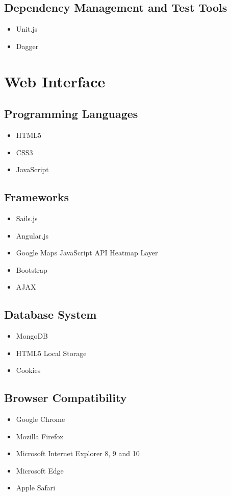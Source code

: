 \documentclass[11pt,fleqn]{book} %
\begin{document}
	\subsection{Dependency Management and Test Tools}
	\begin{itemize}
		\item Unit.js
		\item Dagger
	\end{itemize}
	\section{Web Interface}
	\subsection{Programming Languages}
	\begin{itemize}
		\item HTML5
		\item CSS3
		\item JavaScript
	\end{itemize}
	\subsection{Frameworks}
	\begin{itemize}
		\item Sails.js
		\item Angular.js
		\item Google Maps JavaScript API Heatmap Layer
		\item Bootstrap
		\item AJAX					
	\end{itemize}
	\subsection{Database System}
	\begin{itemize}
		\item MongoDB
		\item HTML5 Local Storage
		\item Cookies				
	\end{itemize}
	\subsection{Browser Compatibility}
	\begin{itemize}
		\item Google Chrome
		\item Mozilla Firefox
		\item Microsoft Internet Explorer 8, 9 and 10
		\item Microsoft Edge
		\item Apple Safari						
	\end{itemize}
\end{document}
